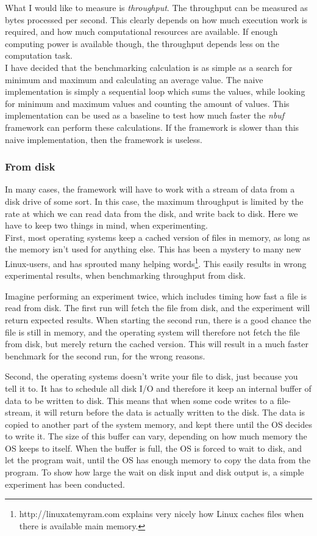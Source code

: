 \documentclass[a4paper]{article}
\newcommand{\nbuf}{\textit{nbuf} }
\begin{document}
What I would like to measure is \textit{throughput}. The throughput can be measured as bytes processed per second. This clearly depends on how much execution work is required, and how much computational resources are available. If enough computing power is available though, the throughput depends less on the computation task.\\

I have decided that the benchmarking calculation is as simple as a search for minimum and maximum and calculating an average value. The naive implementation is simply a sequential loop which sums the values, while looking for minimum and maximum values and counting the amount of values. This implementation can be used as a baseline to test how much faster the \nbuf framework can perform these calculations. If the framework is slower than this naive implementation, then the framework is useless.


\subsubsection{From disk}
In many cases, the framework will have to work with a stream of data from a disk drive of some sort. In this case, the maximum throughput is limited by the rate at which we can read data from the disk, and write back to disk. Here we have to keep two things in mind, when experimenting.\\

First, most operating systems keep a cached version of files in memory, as long as the memory isn't used for anything else. This has been a mystery to many new Linux-users, and has sprouted many helping words\footnote{http://linuxatemyram.com explains very nicely how Linux caches files when there is available main memory.}. This easily results in wrong experimental results, when benchmarking throughput from disk.

Imagine performing an experiment twice, which includes timing how fast a file is read from disk. The first run will fetch the file from disk, and the experiment will return expected results. When starting the second run, there is a good chance the file is still in memory, and the operating system will therefore not fetch the file from disk, but merely return the cached version. This will result in a much faster benchmark for the second run, for the wrong reasons.

Second, the operating systems doesn't write your file to disk, just because you tell it to. It has to schedule all disk I/O and therefore it keep an internal buffer of data to be written to disk. This means that when some code writes to a file-stream, it will return before the data is actually written to the disk. The data is copied to another part of the system memory, and kept there until the OS decides to write it. The size of this buffer can vary, depending on how much memory the OS keeps to itself. When the buffer is full, the OS is forced to wait to disk, and let the program wait, until the OS has enough memory to copy the data from the program. To show how large the wait on disk input and disk output is, a simple experiment has been conducted.\\
\end{document}
